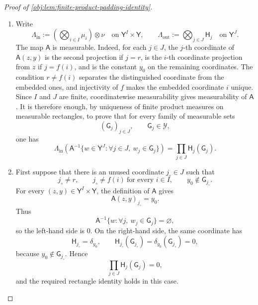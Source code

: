 \documentclass[11pt]{article}
\begin{document}
\begin{proof}[Proof of \cref{obj:lem:finite-product-padding-identity}]
\begin{enumerate}
\item
Write
\[
\Lambda_{\mathrm{in}}
  :=\left(\bigotimes_{i\in I}\mu_i\right)\otimes \nu
  \quad\text{on }\mathsf Y^I\times\mathsf Y,
\qquad
\Lambda_{\mathrm{out}}
  :=\bigotimes_{j\in J}\mathsf H_j
  \quad\text{on }\mathsf Y^J .
\]
The map \(\mathsf A\) is measurable. Indeed, for each \(j\in J\), the \(j\)-th coordinate of
\(\mathsf A(z,y)\) is the second projection if \(j=r\), is the \(i\)-th coordinate projection
from \(z\) if \(j=f(i)\), and is the constant \(y_0\) on the remaining coordinates. The condition
\(r\ne f(i)\) separates the distinguished coordinate from the embedded ones, and injectivity of
\(f\) makes the embedded coordinate \(i\) unique. Since \(I\) and \(J\) are finite, coordinatewise
measurability gives measurability of \(\mathsf A\). It is therefore enough, by uniqueness of finite
product measures on measurable rectangles, to prove that for every family of measurable sets
\[
(\mathsf G_j)_{j\in J},
\qquad
\mathsf G_j\in\mathcal Y ,
\]
one has
\[
\Lambda_{\mathrm{in}}\!\left(\mathsf A^{-1}
  \{w\in\mathsf Y^J:\forall j\in J,\ w_j\in\mathsf G_j\}\right)
=
\prod_{j\in J}\mathsf H_j(\mathsf G_j).
\]

\item
First suppose that there is an unused coordinate \(j_\circ\in J\) such that
\[
j_\circ\ne r,\qquad
j_\circ\ne f(i)\ \text{for every }i\in I,
\qquad
y_0\notin \mathsf G_{j_\circ}.
\]
For every \((z,y)\in\mathsf Y^I\times\mathsf Y\), the definition of \(\mathsf A\) gives
\[
\mathsf A(z,y)_{j_\circ}=y_0.
\]
Thus
\[
\mathsf A^{-1}\{w:\forall j,\ w_j\in\mathsf G_j\}=\varnothing,
\]
so the left-hand side is \(0\). On the right-hand side, the same coordinate has
\[
\mathsf H_{j_\circ}=\delta_{y_0},
\qquad
\mathsf H_{j_\circ}(\mathsf G_{j_\circ})
  =\delta_{y_0}(\mathsf G_{j_\circ})=0,
\]
because \(y_0\notin\mathsf G_{j_\circ}\). Hence
\[
\prod_{j\in J}\mathsf H_j(\mathsf G_j)=0,
\]
and the required rectangle identity holds in this case.


\end{enumerate}
\end{proof}
\end{document}
